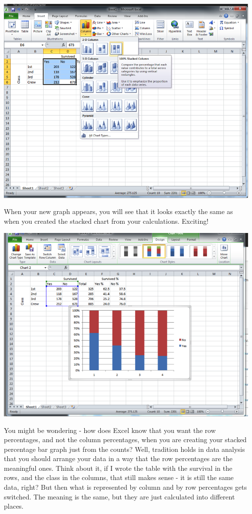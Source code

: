\documentclass[
]{book}
\begin{document}
\includegraphics{imgs/stacked_col_perc.png}

When your new graph appears, you will see that it looks exactly the same as when you created the stacked chart from your calculations. Exciting!

\includegraphics{imgs/stacked_col_perc_2.png}

You might be wondering - how does Excel know that you want the row percentages, and not the column percentages, when you are creating your stacked percentage bar graph just from the counts? Well, tradition holds in data analysis that you should arrange your data in a way that the row percentages are the meaningful ones. Think about it, if I wrote the table with the survival in the rows, and the class in the columns, that still makes sense - it is still the same data, right? But then what is represented by column and by row percentages gets switched. The meaning is the same, but they are just calculated into different places.
\end{document}
